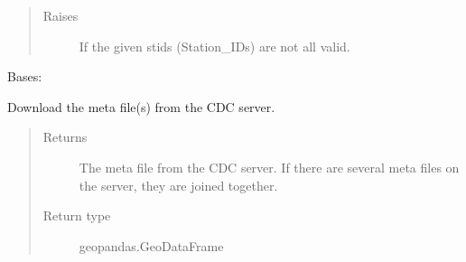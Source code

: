 \documentclass[letterpaper,10pt,english]{sphinxmanual}
\begin{document}
\begin{fulllineitems}
\begin{fulllineitems}
\begin{quote}
\begin{description}
\item[{Raises}] \leavevmode
\sphinxAtStartPar
{} \textendash{} If the given stids (Station\_IDs) are not all valid.

\end{description}\end{quote}

\end{fulllineitems}


\end{fulllineitems}


\begin{fulllineitems}
\label{\detokenize{weatherDB:weatherDB.stations.StationsBase}}
\sphinxAtStartPar
Bases: 

\begin{fulllineitems}
\label{\detokenize{weatherDB:weatherDB.stations.StationsBase.__init__}}
\end{fulllineitems}


\begin{fulllineitems}
\label{\detokenize{weatherDB:weatherDB.stations.StationsBase.download_meta}}
\sphinxAtStartPar
Download the meta file(s) from the CDC server.
\begin{quote}\begin{description}
\item[{Returns}] \leavevmode
\sphinxAtStartPar
The meta file from the CDC server.
If there are several meta files on the server, they are joined together.

\item[{Return type}] \leavevmode
\sphinxAtStartPar
geopandas.GeoDataFrame

\end{description}\end{quote}


\end{fulllineitems}
\end{fulllineitems}
\end{document}
